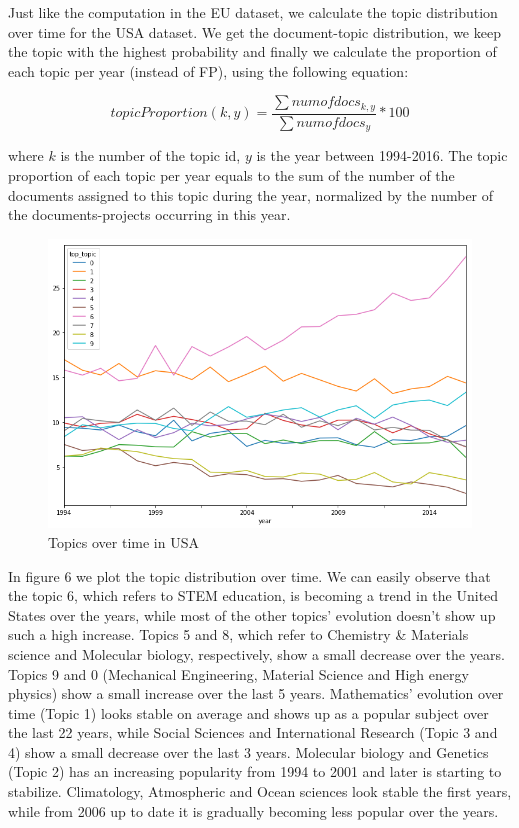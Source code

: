 \documentclass[12pt]{report}
\begin{document}
Just like the computation in the EU dataset, we calculate the topic 
distribution over time for the USA dataset. We get the document-topic 
distribution, we keep the topic with the highest probability and finally 
we calculate the proportion of each topic per
year (instead of FP), using the following equation:

\begin{equation}
topicProportion(k, y) = \frac{\sum num of docs_{k,y}}{\sum num of docs_{y}} * 100
\end{equation}

where $k$ is the number of the topic id, $y$ is the year between 1994-2016. The
topic proportion of each topic per year equals to the sum of the number of the
documents assigned to this topic during the year, normalized by the number of
the documents-projects  occurring in this year.
\begin{center}
\begin{figure}[h]
\centering
\includegraphics[width=1.0\textwidth]
{figs/topic-evolution-usa.png}
\caption{Topics over time in USA}
\end{figure}
\label{usatrend}
\end{center}
In figure 6 we plot the topic distribution over time. We can easily
observe that the topic 6, which refers to STEM education, is becoming
a trend in the United States over the years, while most of the other
topics' evolution doesn't show up such a high increase. Topics 5 and
8, which refer to Chemistry \& Materials science and Molecular
biology, respectively, show a small decrease over the years. Topics 9
and 0 (Mechanical Engineering, Material Science and High energy
physics) show a small increase over the last 5 years. Mathematics'
evolution over time (Topic 1) looks stable on average and shows up as
a popular subject over the last 22 years, while Social Sciences and
International Research (Topic 3 and 4) show a small decrease over the
last 3 years. Molecular biology and Genetics (Topic 2) has an
increasing popularity from 1994 to 2001 and later is starting to
stabilize. Climatology, Atmospheric and Ocean sciences look stable the
first years, while from 2006 up to date it is gradually becoming less
popular over the years.
\end{document}
